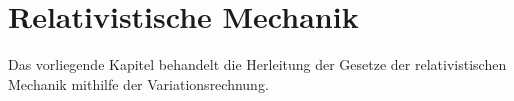 %
%
%
%
%

\chapter{Relativistische Mechanik\label{chapter:relativ}}
\begin{refsection}

Das vorliegende Kapitel behandelt die Herleitung der Gesetze der relativistischen Mechanik
mithilfe der Variationsrechnung.






\printbibliography[heading=subbibliography]
\end{refsection}
